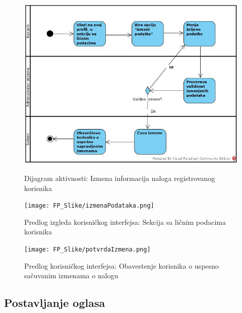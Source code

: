 \documentclass[20pt]{article}
\begin{document}
\begin{figure}[h]
        \centering
        \includegraphics[width=1.1\textwidth,height=0.74\textheight]{Pictures/IzmenaInformacijaNalogaKorisnika.jpg}\\
        \caption{Dijagram aktivnosti: Izmena informacija naloga registrovanog korisnika}
        \label{fig:dijagramAktivnostiIzmenaNaloga}
    \end{figure}
\newpage
\begin{figure}[h]
        \centering
        \texttt{[image: FP\_Slike/izmenaPodataka.png]}\\
        \caption{Predlog izgleda korisni\v ckog interfejsa: Sekcija sa li\v cnim podacima korisnika}
    \end{figure}
\newpage
\begin{figure}[h]
        \centering
        \texttt{[image: FP\_Slike/potvrdaIzmena.png]}\\
        \caption{Predlog korisni\v ckog interfejsa: Obavestenje korisnika o uspesno sa\v cuvanim izmenama o nalogu}
    \end{figure}
\newpage
\subsection{\bfseries \Large Postavljanje oglasa}
\setlength{\parindent}{1cm}
\fontsize{13}{18} \selectfont 
\end{document}
